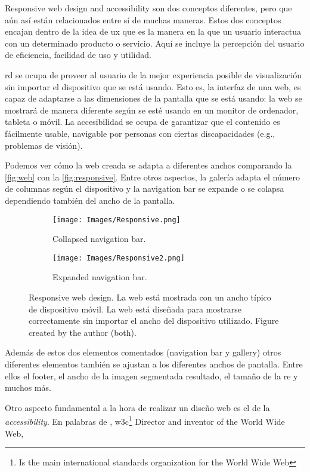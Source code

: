 Responsive web design and accessibility son dos conceptos diferentes, pero que
aún así están relacionados entre sí de muchas maneras. Estos dos conceptos
encajan dentro de la idea de \gls{ux} que es la manera
en la que un usuario interactua con un determinado producto o servicio. Aquí se
incluye la percepción del usuario de eficiencia, facilidad de uso y utilidad.

\gls{rd} se ocupa de proveer al usuario de la mejor experiencia posible de
visualización sin importar el dispositivo que se está usando. Esto es, la
interfaz de una web, es capaz de adaptarse a las dimensiones de la pantalla que
se está usando: la web se mostrará de manera diferente según se esté usando en
un monitor de ordenador, tableta o móvil. La accesibilidad se ocupa de
garantizar que el contenido es fácilmente usable, navigable por personas con
ciertas discapacidades (e.g., problemas de visión).

Podemos ver cómo la web creada se adapta a diferentes anchos comparando la
\vref{fig:web} con la \vref{fig:responsive}. Entre otros aspectos, la galería
adapta el número de columnas según el dispositivo y la navigation bar se
expande o se colapsa dependiendo también del ancho de la pantalla.

\begin{figure}[ht]
  \centering
  \begin{subfigure}[t]{.5\textwidth}
    \centering
    \caption{Collapsed navigation bar.}
    \texttt{[image: Images/Responsive.png]}
  \end{subfigure}\hfill
  \begin{subfigure}[t]{.5\textwidth}
    \centering
    \caption{Expanded navigation bar.}
    \texttt{[image: Images/Responsive2.png]}
  \end{subfigure}
  \caption[Responsive web design.]{Responsive web design. La web está mostrada
    con un ancho típico de dispositivo móvil. La web está diseñada para
    mostrarse correctamente sin importar el ancho del dispositivo
    utilizado. Figure created by the author (both).}\label{fig:responsive}
\end{figure}

Además de estos dos elementos comentados (navigation bar y gallery) otros
diferentes elementos también se ajustan a los diferentes anchos de
pantalla. Entre ellos el footer, el ancho de la imagen segmentada resultado, el
tamaño de la \gls{re} y muchos más.

Otro aspecto fundamental a la hora de realizar un diseño web es el de la
\emph{accessibility}. En palabras de
, \gls{w3c}\footnote{Is the main
  international standards organization for the World Wide Web} Director and
inventor of the World Wide Web,

